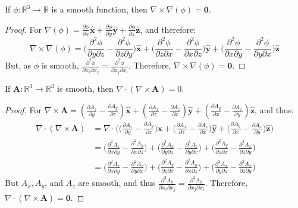 \documentclass[crop=false,class=book]{standalone}
\begin{document}
\begin{theorem}
If $\phi:\mathbb{R}^{3}\rightarrow \mathbb{R}$ is a smooth function, then $\nabla \times \nabla(\phi) = \boldsymbol{0}$.
\end{theorem}
\begin{proof}
For $\nabla(\phi) = \frac{\partial \phi}{\partial x}\hat{\mathbf{x}}+\frac{\partial \phi}{\partial y}\hat{\mathbf{y}}+\frac{\partial \phi}{\partial z}\hat{\mathbf{z}}$, and therefore:
\begin{equation*}
    \nabla \times \nabla(\phi) = \bigg(\frac{\partial^{2} \phi}{\partial y \partial z} - \frac{\partial^{2}\phi}{\partial z \partial y}\bigg)\hat{\mathbf{x}}+\bigg(\frac{\partial^{2} \phi}{\partial z \partial x} - \frac{\partial^{2}\phi}{\partial x \partial z}\bigg)\hat{\mathbf{y}}+\bigg(\frac{\partial^{2} \phi}{\partial x \partial y} - \frac{\partial^{2}\phi}{\partial y \partial x}\bigg)\hat{\mathbf{z}}
\end{equation*}
But, as $\phi$ is smooth, $\frac{\partial^{2}\phi}{\partial x_{i}\partial x_{j}} = \frac{\partial^{2}\phi}{\partial x_{j}\partial x_{i}}$. Therefore, $\nabla \times \nabla(\phi) = \boldsymbol{0}$.
\end{proof}
\begin{theorem}
If $\mathbf{A}:\mathbb{R}^{3}\rightarrow \mathbb{R}^{3}$ is smooth, then $\nabla\cdot(\nabla \times \mathbf{A}) = 0$.
\end{theorem}
\begin{proof}
For $\nabla \times \mathbf{A} = (\frac{\partial A_{z}}{\partial y} - \frac{\partial A_{y}}{\partial z})\hat{\mathbf{x}}+(\frac{\partial A_{x}}{\partial z} - \frac{\partial A_{z}}{\partial x})\hat{\mathbf{y}}+(\frac{\partial A_{y}}{\partial x} - \frac{\partial A_{x}}{\partial y})\hat{\mathbf{z}}$, and thus:
\begin{align*}
    \nabla \cdot (\nabla \times \mathbf{A}) &=\nabla \cdot \bigg(\big(\frac{\partial A_{z}}{\partial y} - \frac{\partial A_{y}}{\partial z}\big)\hat{\mathbf{x}}+\big(\frac{\partial A_{x}}{\partial z} - \frac{\partial A_{z}}{\partial x}\big)\hat{\mathbf{y}}+\big(\frac{\partial A_{y}}{\partial x} - \frac{\partial A_{x}}{\partial y}\big)\hat{\mathbf{z}}\bigg)\\
    &=\bigg(\frac{\partial^{2}A_{z}}{\partial x \partial y} - \frac{\partial^{2}A_{y}}{\partial x \partial z}\bigg)+\bigg(\frac{\partial^{2}A_{x}}{\partial y \partial z} - \frac{\partial^{2}A_{z}}{\partial y \partial x}\bigg) + \bigg(\frac{\partial^{2} A_{y}}{\partial z \partial x} - \frac{\partial^{2} A_{x}}{\partial z \partial y}\bigg)\\
    &= \bigg(\frac{\partial^{2} A_{z}}{\partial x \partial y} - \frac{\partial^{2} A_{z}}{\partial y \partial x}\bigg) + \bigg(\frac{\partial^{2} A_{y}}{\partial z \partial x} - \frac{\partial^{2} A_{y}}{\partial x \partial z}\bigg) + \bigg(\frac{\partial^{2}A_{x}}{\partial y \partial z} - \frac{\partial^{2} A_{x}}{\partial z \partial y}\bigg)
\end{align*}
But $A_{x},A_{y}$, and $A_{z}$ are smooth, and thus $\frac{\partial^{2} A_{k}}{\partial x_{i} \partial x_{j}} = \frac{\partial^{2} A_{k}}{\partial x_{j} \partial x_{i}}$. Therefore, $\nabla \cdot (\nabla \times \mathbf{A}) = \boldsymbol{0}$.
\end{proof}
\end{document}
